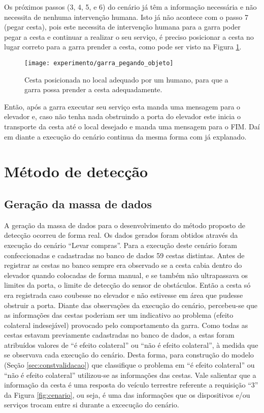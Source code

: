 Os próximos passos (3, 4, 5, e 6) do cenário já têm a informação necessária e não necessita de nenhuma intervenção humana. Isto já não acontece com o passo 7 (pegar cesta), pois este necessita de intervenção humana para a garra poder pegar a cesta e continuar a realizar o seu serviço, é preciso posicionar a cesta no lugar correto para a garra prender a cesta, como pode ser visto na Figura \ref{fig:garra_pegando_objeto}. \begin{figure}[!htb] \centering 
  \centering
  \texttt{[image: experimento/garra\_pegando\_objeto]} 
  \caption{Cesta posicionada no local adequado por um humano, para que a garra possa prender a cesta adequadamente.} 
  \label{fig:garra_pegando_objeto}
\end{figure} Então, após a garra executar seu serviço esta manda uma mensagem para o elevador e, caso não tenha nada obstruindo a porta do elevador este inicia o transporte da cesta até o local desejado e manda uma mensagem para o FIM. Daí em diante a execução do cenário continua da mesma forma com já explanado.

\section{Método de detecção}
\subsection{Geração da massa de dados}
\label{subsec:geracaodados}
A geração da massa de dados para o desenvolvimento do método proposto de detecção ocorreu de forma real. Os dados gerados foram obtidos através da execução do cenário ``Levar compras''. Para a execução deste cenário foram confeccionadas e cadastradas no banco de dados 59 cestas distintas. Antes de registrar as cestas no banco sempre era observado se a cesta cabia dentro do elevador quando colocadas de forma manual, e se também não ultrapassava os limites da porta, o limite de detecção do sensor de obstáculos. Então a cesta só era registrada caso coubesse no elevador e não estivesse em área que pudesse obstruir a porta. Diante das observações da execução do cenário, percebeu-se que as informações das cestas poderiam ser um indicativo ao problema (efeito colateral indesejável) provocado pelo comportamento da garra. Como todas as cestas estavam previamente cadastradas no banco de dados, a estas foram atribuídos valores de ``é efeito colateral'' ou ``não é efeito colateral'', à medida que se observava cada execução do cenário. Desta forma, para construção do modelo (Seção \ref{sec:constvalidacao}) que classifique o problema em ``é efeito colateral'' ou ``não é efeito colateral'' utilizou-se as informações das cestas. Vale salientar que a informação da cesta é uma resposta do veículo terrestre referente a requisição ``3'' da Figura \ref{fig:cenario}, ou seja, é uma das informações que os dispositivos e/ou serviços trocam entre si durante a excecução do cenário.

